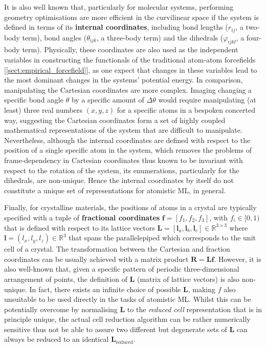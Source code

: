 It is also well known that, particularly for molecular systems, performing geometry optimisations are more efficient in the curvilinear space if the system is defined in terms of its \textbf{internal coordinates},\cite{pulay1979systematic,echenique2006definition} including bond lengths ($r_{ij}$, a two-body term), bond angles ($\theta_{ijk}$, a three-body term) and the dihedrals ($\varphi_{ijkl}$, a four-body term). Physically, these coordinates are also used as the independent variables in constructing the functionals of the traditional atom-atom forcefields [\cref{sect:empirical_forcefield}], as one expect that changes in these variables lead to the most dominant changes in the systems' potential energy. In comparison, manipulating the Cartesian coordinates are more complex. Imaging changing a specific bond angle $\theta$ by a specific amount of $\Delta\theta$ would require manipulating (at least) three real numbers $(x,y,z)$ for a specific atoms in a bespoken concerted way, suggesting the Cartesian coordinates form a set of highly coupled mathematical representations of the system that are difficult to manipulate. Nevertheless, although the internal coordinates are defined with respect to the position of a single specific atom in the system, which removes the problems of frame-dependency in Cartesian coordinates thus known to be invariant with respect to the rotation of the system,\cite{duval2023hitchhiker} its enumerations, particularly for the dihedrals,\cite{echenique2006definition} are non-unique. Hence the internal coordinates by itself do not constitute a unique set of representations for atomistic ML, in general.

Finally, for crystalline materials, the positions of atoms in a crystal are typically specified with a tuple of \textbf{fractional coordinates} $\bm{f}=[f_1,f_2,f_3]$, with $f_i\in [0,1)$ that is defined with respect to its lattice vectors $\bm{L}=[\bm{l}_a,\bm{l}_b,\bm{l}_c]\in\mathbb{R}^{3\times3}$ where $\bm{l}=(l_x,l_y,l_z)\in\mathbb{R}^{3}$ that spans the parallelepiped which corresponds to the unit cell of a crystal. The transformation between the Cartesian and fraction coordinates can be usually achieved with a matrix product $\bm{R}=\bm{L}\bm{f}$. However, it is also well-known that, given a specific pattern of periodic three-dimensional arrangement of points, the definition of $\mathbf{L}$ (matrix of lattice vectors) is also non-unique.  In fact, there exists an infinite choice of possible $\mathbf{L}$, making $f$ also unsuitable to be used directly in the tasks of atomistic ML. Whilst this can be potentially overcome by normalising $\mathbf{L}$ to the \emph{reduced cell} representation that is in principle unique, the actual cell reduction algorithm\cite{kvrivy1976unified}  can be rather numerically sensitive thus not be able to assure two different but degenerate sets of $\mathbf{L}$ can always be reduced to an identical $\mathbf{L}_{\mathrm{reduced}}$.

